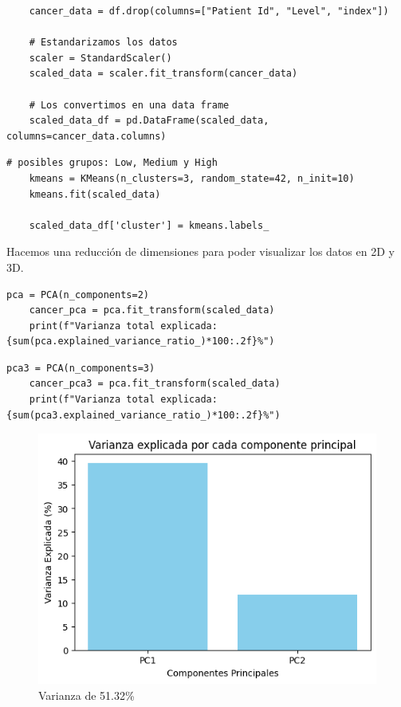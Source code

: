 		
\begin{lstlisting}
    cancer_data = df.drop(columns=["Patient Id", "Level", "index"])

    # Estandarizamos los datos 
    scaler = StandardScaler()
    scaled_data = scaler.fit_transform(cancer_data)

    # Los convertimos en una data frame
    scaled_data_df = pd.DataFrame(scaled_data, columns=cancer_data.columns)
\end{lstlisting}

\begin{lstlisting}[caption={Código de k-means}]
    # posibles grupos: Low, Medium y High
    kmeans = KMeans(n_clusters=3, random_state=42, n_init=10)
    kmeans.fit(scaled_data)

    scaled_data_df['cluster'] = kmeans.labels_
\end{lstlisting}

Hacemos una reducción de dimensiones para poder visualizar los datos en 2D y 3D.  

\begin{lstlisting}[caption={PCA para 2D}]
    pca = PCA(n_components=2)
    cancer_pca = pca.fit_transform(scaled_data)
    print(f"Varianza total explicada: {sum(pca.explained_variance_ratio_)*100:.2f}%")
\end{lstlisting}

\begin{lstlisting}[caption={PCA para 3D}]
    pca3 = PCA(n_components=3)
    cancer_pca3 = pca.fit_transform(scaled_data)
    print(f"Varianza total explicada: {sum(pca3.explained_variance_ratio_)*100:.2f}%")
\end{lstlisting}

\begin{figure}[!h]
    \centering
    \includegraphics[scale = 0.75]{Enrique/Imagenes/Varianza_2d.png}
    \caption{Varianza de 51.32\%}
\end{figure}

